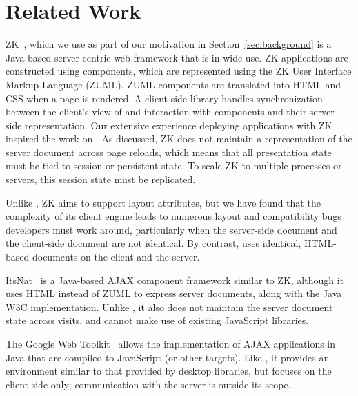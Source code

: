 \section{Related Work}
\label{sec:related}

ZK~\cite{ChenCheng:book2007},
which we use as part of our motivation in Section~\ref{sec:background}
is a Java-based server-centric web framework that is in wide use.
ZK applications are constructed using components, which are represented
using the ZK User Interface Markup Language (ZUML).  ZUML components
are translated into HTML and CSS when a page is rendered.
A client-side library handles synchronization between the client's 
view of and interaction with components and their server-side 
representation.  Our extensive experience deploying applications
with ZK~\cite{Tilevich:aop2008,EdwardsBack:csc2011} inspired the 
work on \cb.  As discussed, ZK does not maintain a representation
of the server document across page reloads, which means that
all presentation state must be tied to session or persistent state.
To scale ZK to multiple processes or servers, this session state must
be replicated.

Unlike \projectname{}, ZK aims to support layout attributes, but
we have found that the complexity of its client engine leads to 
numerous layout and compatibility bugs developers must work around,
particularly when the server-side document and the client-side
document are not identical.  By contrast, \cb uses identical, HTML-based
documents on the client and the server.

ItsNat~\cite{JoseMariaArranzSantamariaItsNat} is a Java-based AJAX
component framework similar to ZK, although it uses HTML instead of
ZUML to express server documents, along with the Java W3C implementation.  
Unlike \projectname, it also does not maintain the server document 
state across visits, and cannot make use of existing JavaScript libraries.

The Google Web Toolkit~\cite{GWT} allows the implementation of
AJAX applications in Java that are compiled to JavaScript (or other
targets).  Like \projectname, it provides an environment similar to 
that provided by desktop libraries, but focuses on the client-side only; 
communication with the server is outside its scope.




